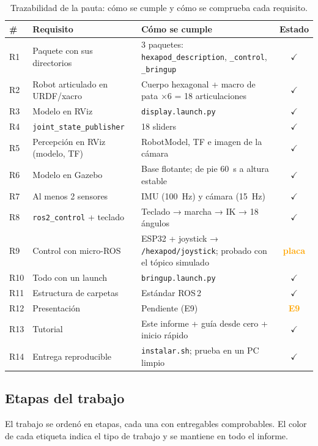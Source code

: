 \documentclass[11pt,a4paper]{article}
\newcommand{\ok}{\textcolor{Verde}{$\checkmark$}}
\newcommand{\subsec}[1]{\Needspace{9\baselineskip}\subsection{#1}}
\begin{document}
\begin{table}[H]\centering\small
\caption{Trazabilidad de la pauta: cómo se cumple y cómo se comprueba cada requisito.}\label{tab:pauta}
\begin{tabularx}{\linewidth}{@{}lYYc@{}}
\toprule
\textbf{\#} & \textbf{Requisito} & \textbf{Cómo se cumple} & \textbf{Estado}\\\midrule
R1 & Paquete con sus directorios & 3 paquetes: \texttt{hexapod\_description}, \texttt{\_control}, \texttt{\_bringup} & \ok\\
R2 & Robot articulado en URDF/xacro & Cuerpo hexagonal + macro de pata ×6 = 18 articulaciones & \ok\\
R3 & Modelo en RViz & \texttt{display.launch.py} & \ok\\
R4 & \texttt{joint\_state\_publisher} & 18 sliders & \ok\\
R5 & Percepción en RViz (modelo, TF) & RobotModel, TF e imagen de la cámara & \ok\\
R6 & Modelo en Gazebo & Base flotante; de pie 60~s a altura estable & \ok\\
R7 & Al menos 2 sensores & IMU (100~Hz) y cámara (15~Hz) & \ok\\
R8 & \texttt{ros2\_control} + teclado & Teclado → marcha → IK → 18 ángulos & \ok\\
R9 & Control con micro-ROS & ESP32 + joystick → \texttt{/hexapod/joystick}; probado con el tópico simulado & \textcolor{Orange}{\bfseries placa}\\
R10 & Todo con un launch & \texttt{bringup.launch.py} & \ok\\
R11 & Estructura de carpetas & Estándar ROS\,2 & \ok\\
R12 & Presentación & Pendiente (E9) & \textcolor{Orange}{\bfseries E9}\\
R13 & Tutorial & Este informe + guía desde cero + inicio rápido & \ok\\
R14 & Entrega reproducible & \texttt{instalar.sh}; prueba en un PC limpio & \ok\\
\bottomrule
\end{tabularx}
\end{table}

\subsec{Etapas del trabajo}

El trabajo se ordenó en etapas, cada una con entregables comprobables. El
color de cada etiqueta indica el tipo de trabajo y se mantiene en todo el
informe.
\end{document}
